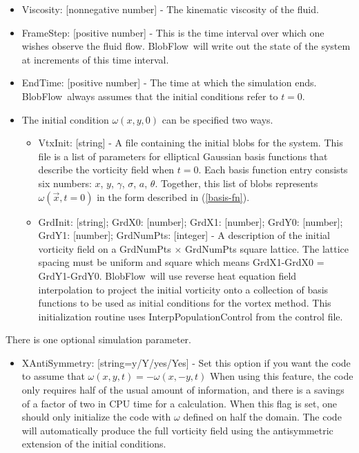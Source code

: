 \documentclass[12pt]{report}
\def\v#1{\vec{#1}}
\newcommand{\eqnn}[1]{(\ref{#1})}
\newcommand{\BF}{BlobFlow}
\begin{document}
\begin{itemize}

\item Viscosity: [nonnegative number] - The kinematic viscosity of the fluid.

\item FrameStep: [positive number] - This is the time interval over which one
wishes observe
the fluid flow.  \BF~will write out the state of the system at
increments of this time interval.

\item EndTime: [positive number] - The time at which the simulation ends. 
\BF~always
assumes that the initial conditions refer to $t=0$.

\item The initial condition $\omega(x,y,0)$ can be specified two ways.

\begin{itemize}

\item VtxInit: [string] - A file containing the initial blobs for the system.
This file is a list of parameters for elliptical Gaussian basis
functions that describe the vorticity field when $t=0$.  Each basis function
entry consists six numbers: $x$, $y$, $\gamma$, $\sigma$, $a$, $\theta$.
Together, this list of blobs represents $\omega (\v x,t=0)$ in the form
described in \eqnn{basis-fn}.

\item GrdInit: [string]; GrdX0: [number]; GrdX1: [number]; GrdY0: [number];
GrdY1: [number]; GrdNumPts: [integer] - A description of the initial vorticity
field on a GrdNumPts $\times$ GrdNumPts square lattice.  The lattice spacing
must be uniform and square which means GrdX1-GrdX0 = GrdY1-GrdY0.  \BF~will use
reverse heat equation field interpolation to project the initial vorticity onto
a collection of basis functions to be used as initial conditions for the vortex
method.  This initialization routine uses InterpPopulationControl from the
control file.

\end{itemize}

\end{itemize}

There is one optional simulation parameter.

\begin{itemize}

\item XAntiSymmetry: [string=y/Y/yes/Yes] - Set this option if you want the code
to assume that $\omega(x,y,t) = -\omega(x,-y,t)$  When
using this feature, the code only requires half of the usual amount of
information, and there is a savings of a factor of two in CPU time for a
calculation.  When this flag is set, one should only initialize the code with
$\omega$ defined on half the domain.  The code will automatically produce the
full vorticity field using the antisymmetric extension of the initial
conditions.

\end{itemize}
\end{document}
